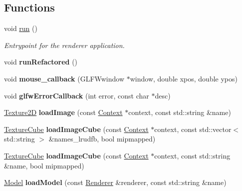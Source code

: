 \subsection*{Functions}
\begin{DoxyCompactItemize}
\item 
void \hyperlink{namespaceblaze_a30b4c7084364b8340000c327f37f794b}{run} ()
\begin{DoxyCompactList}\small\item\em Entrypoint for the renderer application. \end{DoxyCompactList}\item 
\mbox{\label{namespaceblaze_a2ddba469a0ed0509a118c5420eec1d9f}} 
void {\bfseries run\+Refactored} ()
\item 
\mbox{\label{namespaceblaze_aa10526b51f9cf2e534be62ee0fb968b5}} 
void {\bfseries mouse\+\_\+callback} (G\+L\+F\+Wwindow $\ast$window, double xpos, double ypos)
\item 
\mbox{\label{namespaceblaze_aabb1a7d32442a2cb7d6a80f1af0950c4}} 
void {\bfseries glfw\+Error\+Callback} (int error, const char $\ast$desc)
\item 
\mbox{\label{namespaceblaze_addbe0d13f33740eed32a43c54a262f46}} 
\hyperlink{classblaze_1_1Texture2D}{Texture2D} {\bfseries load\+Image} (const \hyperlink{classblaze_1_1Context}{Context} $\ast$context, const std\+::string \&name)
\item 
\mbox{\label{namespaceblaze_a18e94010e92f3c5c427a1c2917623057}} 
\hyperlink{classblaze_1_1TextureCube}{Texture\+Cube} {\bfseries load\+Image\+Cube} (const \hyperlink{classblaze_1_1Context}{Context} $\ast$context, const std\+::vector$<$ std\+::string $>$ \&names\+\_\+lrudfb, bool mipmapped)
\item 
\mbox{\label{namespaceblaze_af3c85a8ea8b8ff5cc17ece5509f1061f}} 
\hyperlink{classblaze_1_1TextureCube}{Texture\+Cube} {\bfseries load\+Image\+Cube} (const \hyperlink{classblaze_1_1Context}{Context} $\ast$context, const std\+::string \&name, bool mipmapped)
\item 
\mbox{\label{namespaceblaze_a692ba015ac23cd0fc2840cdf1eea539d}} 
\hyperlink{classblaze_1_1Model}{Model} {\bfseries load\+Model} (const \hyperlink{classblaze_1_1Renderer}{Renderer} \&renderer, const std\+::string \&name)

\end{DoxyCompactItemize}

